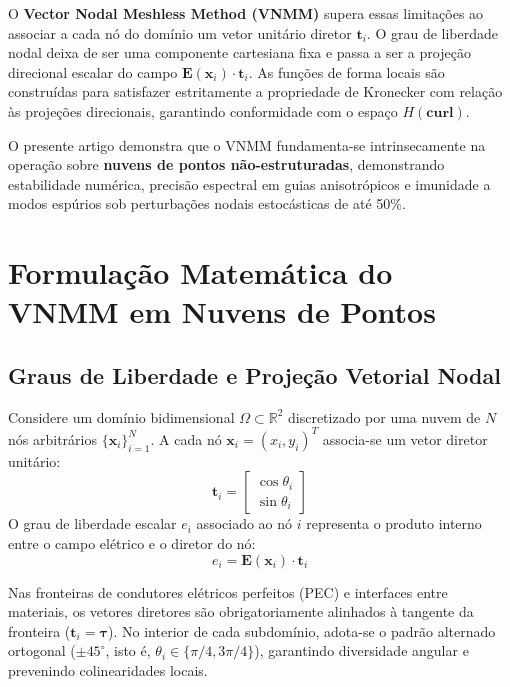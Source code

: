 \documentclass[11pt,a4paper]{article}
\begin{document}
O \textbf{Vector Nodal Meshless Method (VNMM)} \cite{ortiz2021,ortiz2023} supera essas limita\c{c}\~oes ao associar a cada n\'o do dom\'inio um vetor unit\'ario diretor $\mathbf{t}_i$. O grau de liberdade nodal deixa de ser uma componente cartesiana fixa e passa a ser a proje\c{c}\~ao direcional escalar do campo $\mathbf{E}(\mathbf{x}_i)\cdot\mathbf{t}_i$. As fun\c{c}\~oes de forma locais s\~ao constru\'idas para satisfazer estritamente a propriedade de Kronecker com rela\c{c}\~ao \`as proje\c{c}\~oes direcionais, garantindo conformidade com o espa\c{c}o $H(\mathbf{curl})$.

O presente artigo demonstra que o VNMM fundamenta-se intrinsecamente na opera\c{c}\~ao sobre \textbf{nuvens de pontos n\~ao-estruturadas}, demonstrando estabilidade num\'erica, precis\~ao espectral em guias anisotr\'opicos e imunidade a modos esp\'urios sob perturba\c{c}\~oes nodais estoc\'asticas de at\'e 50\%.

\section{Formula\c{c}\~ao Matem\'atica do VNMM em Nuvens de Pontos}

\subsection{Graus de Liberdade e Proje\c{c}\~ao Vetorial Nodal}
Considere um dom\'inio bidimensional $\Omega \subset \mathbb{R}^2$ discretizado por uma nuvem de $N$ n\'os arbitr\'arios $\{\mathbf{x}_i\}_{i=1}^N$. A cada n\'o $\mathbf{x}_i = (x_i, y_i)^T$ associa-se um vetor diretor unit\'ario:
\begin{equation}
\mathbf{t}_i = \begin{bmatrix} \cos\theta_i \\ \sin\theta_i \end{bmatrix}
\end{equation}
O grau de liberdade escalar $e_i$ associado ao n\'o $i$ representa o produto interno entre o campo el\'etrico e o diretor do n\'o:
\begin{equation}
e_i = \mathbf{E}(\mathbf{x}_i) \cdot \mathbf{t}_i
\end{equation}

Nas fronteiras de condutores el\'etricos perfeitos (PEC) e interfaces entre materiais, os vetores diretores s\~ao obrigatoriamente alinhados \`a tangente da fronteira ($\mathbf{t}_i = \boldsymbol{\tau}$). No interior de cada subdom\'inio, adota-se o padr\~ao alternado ortogonal ($\pm 45^\circ$, isto \'e, $\theta_i \in \{\pi/4, 3\pi/4\}$), garantindo diversidade angular e prevenindo colinearidades locais.
\end{document}
